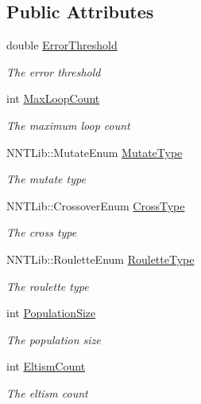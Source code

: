 \subsection*{Public Attributes}
\begin{DoxyCompactItemize}
\item 
double \hyperlink{class_genetic_algorithm_config_ac4ebe8e0ea58e061871638a623ca016f}{Error\+Threshold}
\begin{DoxyCompactList}\small\item\em The error threshold \end{DoxyCompactList}\item 
int \hyperlink{class_genetic_algorithm_config_ae792cdb8d57ceef9a637ac3692e44fa9}{Max\+Loop\+Count}
\begin{DoxyCompactList}\small\item\em The maximum loop count \end{DoxyCompactList}\item 
N\+N\+T\+Lib\+::\+Mutate\+Enum \hyperlink{class_genetic_algorithm_config_ab6412ab79b082c2d36d241a03b8bea1a}{Mutate\+Type}
\begin{DoxyCompactList}\small\item\em The mutate type \end{DoxyCompactList}\item 
N\+N\+T\+Lib\+::\+Crossover\+Enum \hyperlink{class_genetic_algorithm_config_a3a812549ca573f20d6cafc3b651089ba}{Cross\+Type}
\begin{DoxyCompactList}\small\item\em The cross type \end{DoxyCompactList}\item 
N\+N\+T\+Lib\+::\+Roulette\+Enum \hyperlink{class_genetic_algorithm_config_abe0badd59b500a67a8179ca83bd7fea9}{Roulette\+Type}
\begin{DoxyCompactList}\small\item\em The roulette type \end{DoxyCompactList}\item 
int \hyperlink{class_genetic_algorithm_config_a8e8f286ff257bb31ab7c4a64963be30b}{Population\+Size}
\begin{DoxyCompactList}\small\item\em The population size \end{DoxyCompactList}\item 
int \hyperlink{class_genetic_algorithm_config_a410b565ccd042a3eb5bcf914b7eba1c4}{Eltism\+Count}
\begin{DoxyCompactList}\small\item\em The eltism count \end{DoxyCompactList}\item 

\end{DoxyCompactItemize}
